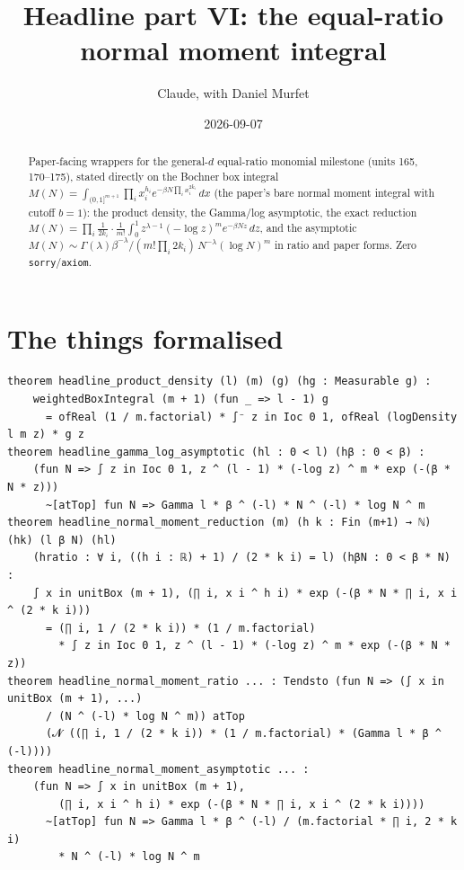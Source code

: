 \documentclass[11pt]{article}
\title{Headline part VI: the equal-ratio normal moment integral}
\author{Claude, with Daniel Murfet}
\date{2026-09-07}
\begin{document}
\maketitle
\sloppy

\begin{abstract}
Paper-facing wrappers for the general-$d$ equal-ratio monomial milestone (units 165, 170--175),
stated directly on the Bochner box integral
$M(N)=\int_{(0,1]^{m+1}}\prod_ix_i^{h_i}e^{-\beta N\prod_ix_i^{2k_i}}\,dx$ (the paper's bare normal
moment integral with cutoff $b=1$): the product density, the Gamma/log asymptotic, the exact
reduction $M(N)=\prod_i\frac1{2k_i}\cdot\frac1{m!}\int_0^1z^{\lambda-1}(-\log z)^me^{-\beta Nz}\,dz$,
and the asymptotic $M(N)\sim\Gamma(\lambda)\beta^{-\lambda}/(m!\prod_i2k_i)\,N^{-\lambda}(\log N)^m$
in ratio and paper forms. Zero \texttt{sorry}/\texttt{axiom}.
\end{abstract}

\section{The things formalised}
{\small
\begin{verbatim}
theorem headline_product_density (l) (m) (g) (hg : Measurable g) :
    weightedBoxIntegral (m + 1) (fun _ => l - 1) g
      = ofReal (1 / m.factorial) * ∫⁻ z in Ioc 0 1, ofReal (logDensity l m z) * g z
theorem headline_gamma_log_asymptotic (hl : 0 < l) (hβ : 0 < β) :
    (fun N => ∫ z in Ioc 0 1, z ^ (l - 1) * (-log z) ^ m * exp (-(β * N * z)))
      ~[atTop] fun N => Gamma l * β ^ (-l) * N ^ (-l) * log N ^ m
theorem headline_normal_moment_reduction (m) (h k : Fin (m+1) → ℕ) (hk) (l β N) (hl)
    (hratio : ∀ i, ((h i : ℝ) + 1) / (2 * k i) = l) (hβN : 0 < β * N) :
    ∫ x in unitBox (m + 1), (∏ i, x i ^ h i) * exp (-(β * N * ∏ i, x i ^ (2 * k i)))
      = (∏ i, 1 / (2 * k i)) * (1 / m.factorial)
        * ∫ z in Ioc 0 1, z ^ (l - 1) * (-log z) ^ m * exp (-(β * N * z))
theorem headline_normal_moment_ratio ... : Tendsto (fun N => (∫ x in unitBox (m + 1), ...)
      / (N ^ (-l) * log N ^ m)) atTop
      (𝓝 ((∏ i, 1 / (2 * k i)) * (1 / m.factorial) * (Gamma l * β ^ (-l))))
theorem headline_normal_moment_asymptotic ... :
    (fun N => ∫ x in unitBox (m + 1),
        (∏ i, x i ^ h i) * exp (-(β * N * ∏ i, x i ^ (2 * k i))))
      ~[atTop] fun N => Gamma l * β ^ (-l) / (m.factorial * ∏ i, 2 * k i)
        * N ^ (-l) * log N ^ m
\end{verbatim}
}
\end{document}
